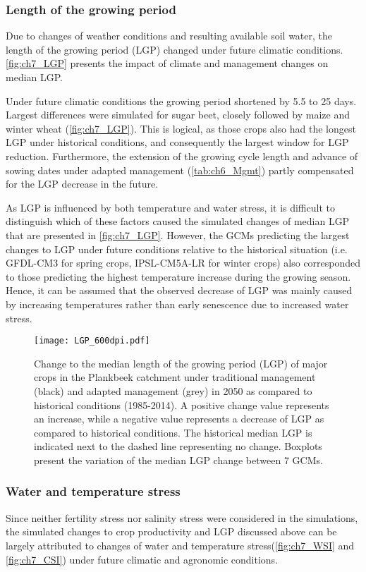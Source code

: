 \subsubsection{Length of the growing period}
Due to changes of weather conditions and resulting available soil water, the length of the growing period (LGP) changed under future climatic conditions. \autoref{fig:ch7_LGP} presents the impact of climate and management changes on median LGP. 

Under future climatic conditions the growing period shortened by 5.5 to 25 days. Largest differences were simulated for sugar beet, closely followed by maize and winter wheat (\autoref{fig:ch7_LGP}). This is logical, as those crops also had the longest LGP under historical conditions, and consequently the largest window for LGP reduction. Furthermore, the extension of the growing cycle length and advance of sowing dates under adapted management (\autoref{tab:ch6_Mgmt}) partly compensated for the LGP decrease in the future. 

As LGP is influenced by both temperature and water stress, it is difficult to distinguish which of these factors caused the simulated changes of median LGP that are presented in \autoref{fig:ch7_LGP}. However, the GCMs predicting the largest changes to LGP under future conditions relative to the historical situation (i.e. GFDL-CM3 for spring crops, IPSL-CM5A-LR for winter crops) also corresponded to those predicting the highest temperature increase during the growing season. Hence, it can be assumed that the observed decrease of LGP was mainly caused by increasing temperatures rather than early senescence due to increased water stress. 

\begin{figure}[tbhp]
	\centering
		\texttt{[image: LGP\_600dpi.pdf]}
	\caption{Change to the median length of the growing period (LGP) of major crops in the Plankbeek catchment under traditional management (black) and adapted management (grey) in 2050 as compared to historical conditions (1985-2014). A positive change value represents an increase, while a negative value represents a decrease of LGP as compared to historical conditions. The historical median LGP is indicated next to the dashed line representing no change. Boxplots present the variation of the median LGP change between 7 GCMs.}
	\label{fig:ch7_LGP}
\end{figure}  

\subsubsection{Water and temperature stress}
Since neither fertility stress nor salinity stress were considered in the simulations, the simulated changes to crop productivity and LGP discussed above can be largely attributed to changes of water and temperature stress(\autoref{fig:ch7_WSI} and \autoref{fig:ch7_CSI}) under future climatic and agronomic conditions. 
 
